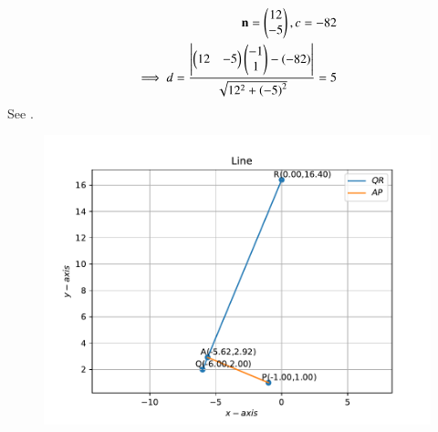 \begin{align}
		\mathbf{n} = \begin{pmatrix}
	  12 \\
	  -5 
	  \end{pmatrix} ,   c = -82 
	  \\
	  \implies 
	d 
	= \frac{\left\vert  \begin{pmatrix}12 & -5 \end{pmatrix}\begin{pmatrix}-1 \\ 1\end{pmatrix}-\left(-82\right) \right\vert}{\sqrt{12^2+\left(-5\right)^2}} 	
	= 5
\end{align}
See .
\begin{figure}[!h]
	\begin{center}
		\includegraphics[width=\columnwidth]{chapters/11/10/3/4/figs/problem4.pdf}
	\end{center}
\caption{}
\label{fig:11/10/3/4/Fig1}
\end{figure}

